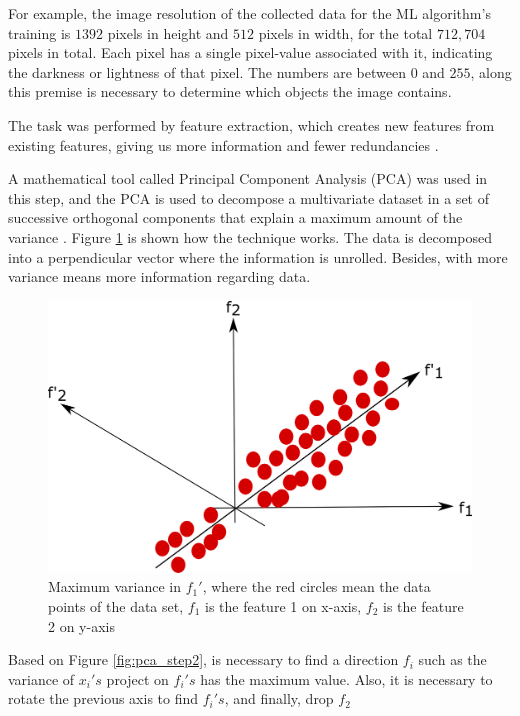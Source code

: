 For example, the image resolution of the collected data for the ML algorithm's training is $1392$ pixels in height and $512$ pixels in width, for the total $712,704$ pixels in total. Each pixel has a single pixel-value associated with it, indicating the darkness or lightness of that pixel. The numbers are between $0$ and $255$, along this premise is necessary to determine which objects the image contains.

The task was performed by feature extraction, which creates new features from existing features, giving us more information and fewer redundancies \cite{wang2019data}.

A mathematical tool called Principal Component Analysis (PCA) was used in this step, and the PCA is used to decompose a multivariate dataset in a set of successive orthogonal components that explain a maximum amount of the variance \cite{pedregosa2011scikit}. Figure \ref{fig:pca_step1} is shown how the technique works. The data is decomposed into a perpendicular vector where the information is unrolled. Besides, with more variance means more information regarding data.

\begin{figure}[H]
\centering
\includegraphics[scale=0.7]{imagens/pca1.png}
\caption{Maximum variance in $f_1'$, where the red circles mean the data points of the data set, $f_1$ is the feature 1 on x-axis, $f_2$ is the feature 2 on y-axis}
\label{fig:pca_step1}
\end{figure}


Based on Figure \ref{fig:pca_step2}, is necessary to find a direction $f_i$ such as the variance of $x_i's$ project on $f_i's$ has the maximum value. Also, it is necessary to rotate the previous axis to find $f_i' s$, and finally, drop $f_2$

